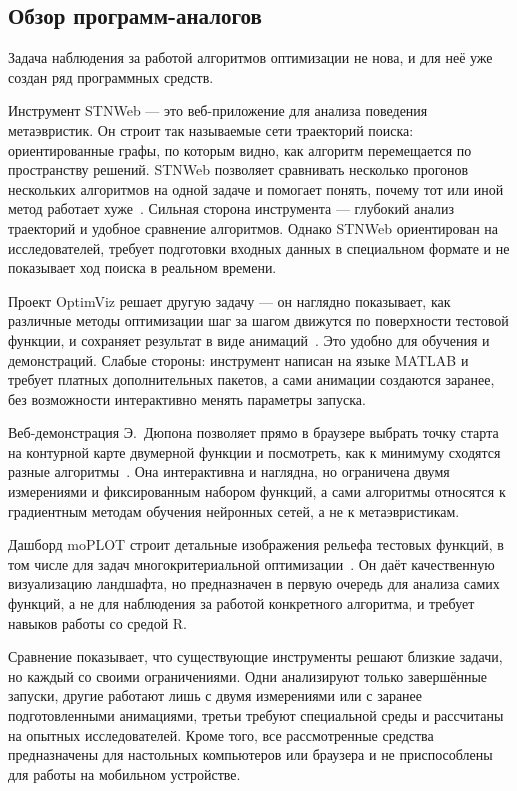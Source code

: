 \documentclass[14pt, a4paper]{extarticle}
\begin{document}
\subsection{Обзор программ-аналогов}
\label{subsec:analogs}

Задача наблюдения за работой алгоритмов оптимизации не нова, и для неё уже создан
ряд программных средств. 

Инструмент STNWeb --- это веб-приложение для анализа поведения метаэвристик. Он
строит так называемые сети траекторий поиска: ориентированные графы, по которым
видно, как алгоритм перемещается по пространству решений. STNWeb позволяет
сравнивать несколько прогонов нескольких алгоритмов на одной задаче и помогает
понять, почему тот или иной метод работает хуже~\cite{stnweb2023}. Сильная
сторона инструмента --- глубокий анализ траекторий и удобное сравнение
алгоритмов. Однако STNWeb ориентирован на исследователей, требует подготовки
входных данных в специальном формате и не показывает ход поиска в реальном
времени.

Проект OptimViz решает другую задачу --- он наглядно показывает, как различные
методы оптимизации шаг за шагом движутся по поверхности тестовой функции, и
сохраняет результат в виде анимаций~\cite{optimviz}. Это удобно для обучения и
демонстраций. Слабые стороны: инструмент написан на языке MATLAB и требует
платных дополнительных пакетов, а сами анимации создаются заранее, без
возможности интерактивно менять параметры запуска.

Веб-демонстрация Э.~Дюпона позволяет прямо в браузере выбрать точку старта на
контурной карте двумерной функции и посмотреть, как к минимуму сходятся разные
алгоритмы~\cite{dupont2018}. Она интерактивна и наглядна, но ограничена двумя
измерениями и фиксированным набором функций, а сами алгоритмы относятся к
градиентным методам обучения нейронных сетей, а не к метаэвристикам.

Дашборд moPLOT строит детальные изображения рельефа тестовых функций, в том числе
для задач многокритериальной оптимизации~\cite{moplot2021}. Он даёт качественную
визуализацию ландшафта, но предназначен в первую очередь для анализа самих функций,
а не для наблюдения за работой конкретного алгоритма, и требует навыков работы со
средой R.

Сравнение показывает, что существующие инструменты решают близкие задачи, но
каждый со своими ограничениями. Одни анализируют только завершённые запуски,
другие работают лишь с двумя измерениями или с заранее подготовленными анимациями,
третьи требуют специальной среды и рассчитаны на опытных исследователей. Кроме
того, все рассмотренные средства предназначены для настольных компьютеров или
браузера и не приспособлены для работы на мобильном устройстве.
\end{document}
